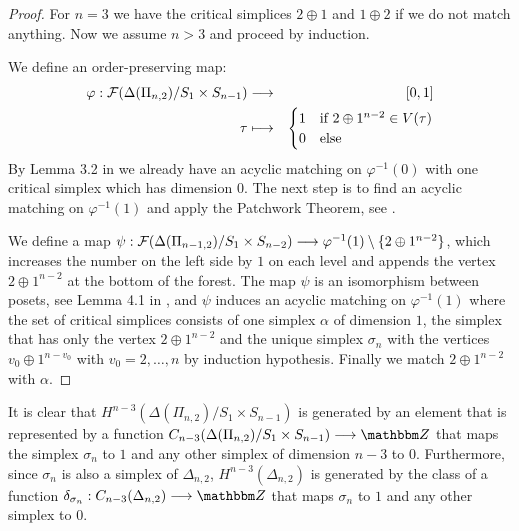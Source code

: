 \documentclass{elsarticle}
\def\Z{\mathbbm Z}
\begin{document}
\begin{proof}
For $n=3$ we have the critical simplices $2\oplus1$ and $1\oplus2$ if we do not match anything. Now we assume $n>3$ and proceed by induction.

We define an order-preserving map:
\begin{eqnarray*}
\varphi:{\cal F}(\Delta(\Pi_{n,2})/S_1\times S_{n-1})&\longrightarrow&[0,1]\\
\tau&\longmapsto&
\begin{cases}
1&\text{if $2\oplus 1^{n-2}\in V(\tau)$}\\
0&\text{else}
\end{cases}
\end{eqnarray*}
By Lemma 3.2 in \cite{donau}
we already have an acyclic matching on $\varphi^{-1}(0)$ with one critical simplex which has dimension $0$. The next step is to find an acyclic matching on $\varphi^{-1}(1)$ and apply the Patchwork Theorem, see \cite[Chapter 11]{buch}.

We define a map $\psi:{\cal F}(\Delta(\Pi_{n-1,2})/S_1\times S_{n-2})\longrightarrow\varphi^{-1}(1)\setminus\{2\oplus 1^{n-2}\}$, which increases the number on the left side by $1$ on each level and appends the vertex $2\oplus 1^{n-2}$ at the bottom of the forest. The map $\psi$ is an isomorphism between posets,
see Lemma 4.1 in \cite{donau},
and $\psi$ induces an acyclic matching on $\varphi^{-1}(1)$ where the set of critical simplices consists of one simplex $\alpha$ of dimension $1$, the simplex that has only the vertex $2\oplus 1^{n-2}$ and the unique simplex $\sigma_n$ with the vertices $v_0\oplus 1^{n-v_0}$ with $v_0=2,\dots,n$ by induction hypothesis. Finally we match $2\oplus 1^{n-2}$ with $\alpha$.
\end{proof}
It is clear that $H^{n-3}(\Delta(\Pi_{n,2})/S_1\times S_{n-1})$ is generated by an element that is represented by a function $C_{n-3}(\Delta(\Pi_{n,2})/S_1\times S_{n-1})\longrightarrow\Z$ that maps the simplex $\sigma_n$ to $1$ and any other simplex of dimension $n-3$ to $0$. Furthermore, since $\sigma_n$ is also a simplex of $\Delta_{n,2}$, $H^{n-3}(\Delta_{n,2})$ is generated by the class of a function $\delta_{\sigma_n}:C_{n-3}(\Delta_{n,2})\longrightarrow\Z$ that maps $\sigma_n$ to $1$ and any other simplex to $0$.
\end{document}
